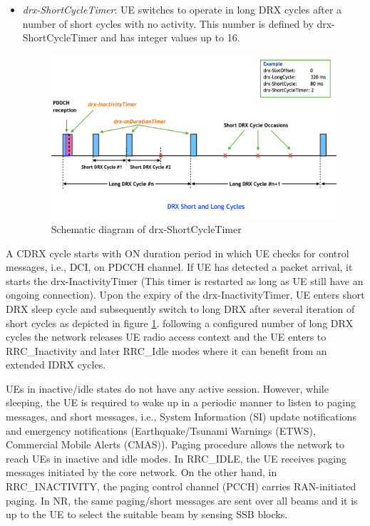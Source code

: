 \documentclass[conference]{IEEEtran}
\begin{document}
\begin{itemize}
    \item \textit{drx-ShortCycleTimer}: UE switches to operate in long DRX cycles after a number of short cycles with no activity. This number is defined by drx-ShortCycleTimer and has integer values up to 16.
\begin{figure}
    \centering
    \includegraphics[width=\linewidth]{Pictures/Schematic diagram of drx-ShortCycleTimer.png}
    \caption{Schematic diagram of drx-ShortCycleTimer}
    \label{fig:5g-drx-ShortCycleTimer}
\end{figure}

\end{itemize}

A CDRX cycle starts with ON duration period in which UE checks for control messages, i.e., DCI, on PDCCH channel. If UE has detected a packet arrival, it starts the drx-InactivityTimer (This timer is restarted as long as UE still have an ongoing connection). Upon the expiry of the drx-InactivityTimer, UE enters short DRX sleep cycle and subsequently switch to long DRX after several iteration of short cycles as depicted in figure \ref{fig:5g-drx-ShortCycleTimer}. following a configured number of long DRX cycles the network releases UE radio access context and the UE enters to RRC\_Inactivity and later RRC\_Idle modes where it can benefit from an extended IDRX cycles.



UEs in inactive/idle states do not have any active session. However, while sleeping, the UE is required to wake up in a periodic manner to listen to paging messages, and short messages, i.e., System Information (SI) update notifications and emergency notifications (Earthquake/Tsunami Warnings (ETWS), Commercial Mobile Alerts (CMAS)). Paging procedure allows the network to reach UEs in inactive and idle modes. In RRC\_IDLE, the UE receives paging messages initiated by the core network. On the other hand, in RRC\_INACTIVITY, the paging control channel (PCCH) carries RAN-initiated paging. In NR, the same paging/short messages are sent over all beams and it is up to the UE to select the suitable beam by sensing SSB blocks.
\end{document}
